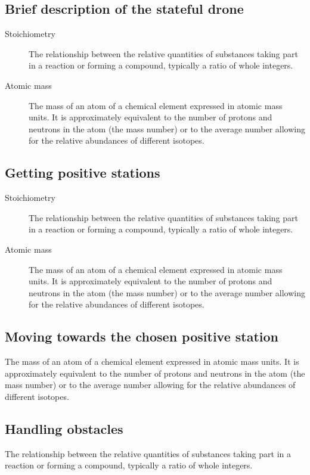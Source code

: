 \documentclass{article}
\begin{document}
\subsection{Brief description of the stateful drone}
\label{Class Relationships}
\begin{description}
\item[Stoichiometry]
The relationship between the relative quantities of substances taking part in a reaction or forming a compound, typically a ratio of whole integers.
\item[Atomic mass]
The mass of an atom of a chemical element expressed in atomic mass units. It is approximately equivalent to the number of protons and neutrons in the atom (the mass number) or to the average number allowing for the relative abundances of different isotopes. 
\end{description} 

\subsection{Getting positive stations}
\label{Class Relationships}
\begin{description}
\item[Stoichiometry]
The relationship between the relative quantities of substances taking part in a reaction or forming a compound, typically a ratio of whole integers.
\item[Atomic mass]
The mass of an atom of a chemical element expressed in atomic mass units. It is approximately equivalent to the number of protons and neutrons in the atom (the mass number) or to the average number allowing for the relative abundances of different isotopes. 
\end{description} 

\subsection{Moving towards the chosen positive station}
\label{Class Relationships}
\begin{description}
The mass of an atom of a chemical element expressed in atomic mass units. It is approximately equivalent to the number of protons and neutrons in the atom (the mass number) or to the average number allowing for the relative abundances of different isotopes. 
\end{description} 


\subsection{Handling obstacles}
\label{Class Relationships}
\begin{description}
The relationship between the relative quantities of substances taking part in a reaction or forming a compound, typically a ratio of whole integers.
\end{description} 
\end{document}
